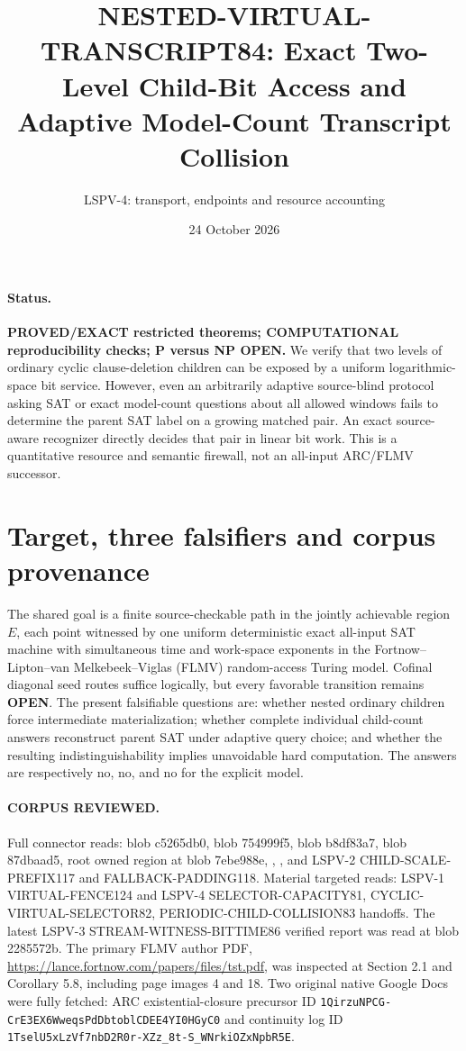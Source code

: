 \documentclass[11pt]{article}
\title{NESTED-VIRTUAL-TRANSCRIPT84: Exact Two-Level Child-Bit Access and Adaptive Model-Count Transcript Collision}
\author{LSPV-4: transport, endpoints and resource accounting}
\date{24 October 2026}
\begin{document}
\maketitle
\paragraph{Status.}
\textbf{PROVED/EXACT restricted theorems; COMPUTATIONAL reproducibility checks; P versus NP OPEN.} We verify that two levels of ordinary cyclic clause-deletion children can be exposed by a uniform logarithmic-space bit service. However, even an arbitrarily adaptive source-blind protocol asking SAT or exact model-count questions about all allowed windows fails to determine the parent SAT label on a growing matched pair. An exact source-aware recognizer directly decides that pair in linear bit work. This is a quantitative resource and semantic firewall, not an all-input ARC/FLMV successor.

\section{Target, three falsifiers and corpus provenance}
The shared goal is a finite source-checkable path in the jointly achievable region \(E\), each point witnessed by one uniform deterministic exact all-input SAT machine with simultaneous time and work-space exponents in the Fortnow--Lipton--van Melkebeek--Viglas (FLMV) random-access Turing model. Cofinal diagonal seed routes suffice logically, but every favorable transition remains \textbf{OPEN}. The present falsifiable questions are: whether nested ordinary children force intermediate materialization; whether complete individual child-count answers reconstruct parent SAT under adaptive query choice; and whether the resulting indistinguishability implies unavoidable hard computation. The answers are respectively no, no, and no for the explicit model.

\paragraph{CORPUS REVIEWED.}
Full connector reads:  blob c5265db0,  blob 754999f5,  blob b8df83a7,  blob 87dbaad5, root  owned region at blob 7ebe988e, , , and LSPV-2 CHILD-SCALE-PREFIX117 and FALLBACK-PADDING118. Material targeted reads: LSPV-1 VIRTUAL-FENCE124 and LSPV-4 SELECTOR-CAPACITY81, CYCLIC-VIRTUAL-SELECTOR82, PERIODIC-CHILD-COLLISION83 handoffs. The latest LSPV-3 STREAM-WITNESS-BITTIME86 verified report was read at blob 2285572b. The primary FLMV author PDF, \url{https://lance.fortnow.com/papers/files/tst.pdf}, was inspected at Section 2.1 and Corollary 5.8, including page images 4 and 18. Two original native Google Docs were fully fetched: ARC existential-closure precursor ID \texttt{1QirzuNPCG-CrE3EX6WweqsPdDbtoblCDEE4YI0HGyC0} and continuity log ID \texttt{1TselU5xLzVf7nbD2R0r-XZz_8t-S_WNrkiOZxNpbR5E}.
\end{document}
